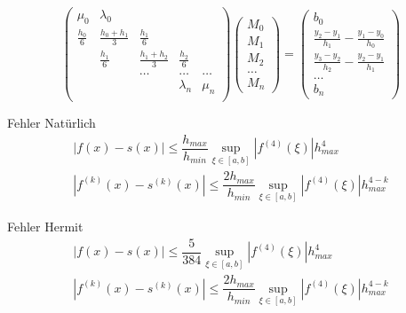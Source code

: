 \documentclass[
	ngerman,
	accentcolor=9c,%
	type=intern,
	marginpar=false
	]{tudapub}
\begin{document}
            \begin{equation*}
                \begin{pmatrix}
                    \mu_0 & \lambda_0 \\
                    \frac{h_0}{6} & \frac{h_0 + h_1}{3} & \frac{h_1}{6}\\
                    & \frac{h_1}{6} & \frac{h_1 + h_2}{3} & \frac{h_2}{6}\\
                    & & \dots & \dots & \dots \\
                    & &  & \lambda_n & \mu_n\\
                \end{pmatrix}
                \begin{pmatrix}
                    M_0\\
                    M_1\\
                    M_2\\
                    \dots\\
                    M_n
                \end{pmatrix}
                =\begin{pmatrix}
                    b_0\\
                    \frac{y_2 - y_1}{h_1} - \frac{y_1-y_0}{h_0}\\
                    \frac{y_3 - y_2}{h_2} - \frac{y_2-y_1}{h_1}\\
                    \dots\\
                    b_n
                \end{pmatrix}
            \end{equation*}
            \setcounter{satz}{5}
            \begin{satz}{Fehler Natürlich}
                \begin{align*}
                    |f(x) - s(x)| \leq \dfrac{h_{max}}{h_{min}} \sup_{\xi\in [a,b]} |f^{(4)}(\xi)| h^4_{max}\\
                    |f^{(k)}(x) - s^{(k)}(x)| \leq \dfrac{2h_{max}}{h_{min}} \sup_{\xi\in [a,b]} |f^{(4)}(\xi)| h^{4-k}_{max}
                \end{align*}
            \end{satz}
            \begin{satz}{Fehler Hermit}
                \begin{align*}
                    |f(x) - s(x)| \leq \dfrac{5}{384} \sup_{\xi\in [a,b]} |f^{(4)}(\xi)| h^4_{max}\\
                    |f^{(k)}(x) - s^{(k)}(x)| \leq \dfrac{2h_{max}}{h_{min}} \sup_{\xi\in [a,b]} |f^{(4)}(\xi)| h^{4-k}_{max}
                \end{align*}
            \end{satz}
            \newpage
\end{document}
